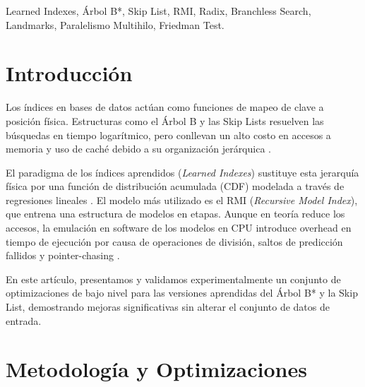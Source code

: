 \documentclass[twocolumn,10pt,journal]{IEEEtran}
\begin{document}
\begin{IEEEkeywords}
Learned Indexes, \'Arbol B*, Skip List, RMI, Radix, Branchless Search, Landmarks, Paralelismo Multihilo, Friedman Test.
\end{IEEEkeywords}

\section{Introducci\'on}

Los \'indices en bases de datos act\'uan como funciones de mapeo de clave a posici\'on f\'isica. Estructuras como el \'Arbol B \cite{comer1979btree} y las Skip Lists \cite{pugh1990skip} resuelven las b\'usquedas en tiempo logar\'itmico, pero conllevan un alto costo en accesos a memoria y uso de cach\'e debido a su organizaci\'on jer\'arquica \cite{kraska2018case}.

El paradigma de los \'indices aprendidos (\textit{Learned Indexes}) sustituye esta jerarqu\'ia f\'isica por una funci\'on de distribuci\'on acumulada (CDF) modelada a trav\'es de regresiones lineales \cite{kraska2018case, marcus2020benchmarking}. El modelo m\'as utilizado es el RMI (\textit{Recursive Model Index}), que entrena una estructura de modelos en etapas. Aunque en teor\'ia reduce los accesos, la emulaci\'on en software de los modelos en CPU introduce overhead en tiempo de ejecuci\'on por causa de operaciones de divisi\'on, saltos de predicci\'on fallidos y pointer-chasing \cite{ferragina2020pgm, galakatos2019fiting}.

En este art\'iculo, presentamos y validamos experimentalmente un conjunto de optimizaciones de bajo nivel para las versiones aprendidas del \'Arbol B* y la Skip List, demostrando mejoras significativas sin alterar el conjunto de datos de entrada.

\section{Metodolog\'ia y Optimizaciones}
\end{document}
